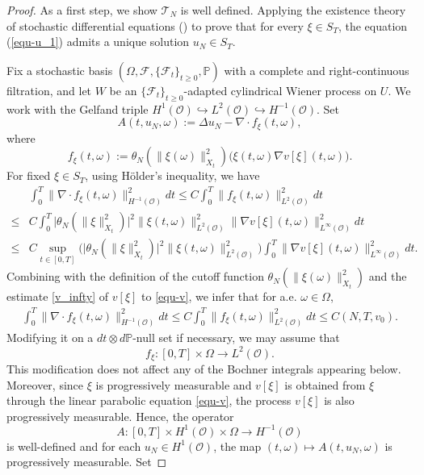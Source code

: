 \documentclass[reqno, 11pt]{amsart}
\theoremstyle{definition}
\numberwithin{equation}{section} \numberwithin{lem}{section}
\numberwithin{thm}{section} \numberwithin{prop}{section}
\numberwithin{cor}{section} \numberwithin{rem}{section}
\numberwithin{defn}{section}
\begin{document}
\begin{proof}
 As a first step, we show $\mathcal{T}_N$ is well defined. Applying the existence theory of stochastic differential equations (\cite[Theorem 4.2.4]{ liu2015stochastic}) to prove that for every $\xi\in S_T$, the equation (\ref{equ-u_1}) admits a unique solution $u_N\in S_T$.

  Fix a stochastic basis
$(\Omega,\mathcal F,\{\mathcal F_t\}_{t\ge0},\mathbb P)$
with a complete and right-continuous filtration, and let $W$ be an $\{\mathcal F_t\}_{t\ge0}$-adapted cylindrical Wiener
process on $U$. We work with the Gelfand triple $H^1(\mathcal {O})\hookrightarrow L^2(\mathcal {O})\hookrightarrow H^{-1}(\mathcal {O}).$
 Set \[
 A(t,u_N,\omega):=\Delta u_N-\nabla\cdot f_\xi(t,\omega),
 \]
 where
 $$
f_\xi(t,\omega):=\theta_N(\|\xi(\omega)\|_{X_t}^2)\Big(\xi(t,\omega)\nabla v[\xi](t,\omega)\Big).$$
 For  fixed $\xi\in S_T$, using H\"older's inequality, we have 
\begin{align}\label{f_xi}
\nonumber&\int_0^T \|\nabla\cdot f_\xi(t,\omega)\|_{H^{-1}(\mathcal {O})}^2dt\le C\int_0^T \| f_\xi(t,\omega)\|_{L^2(\mathcal {O})}^2dt \\
\nonumber\le&
C\int_0^T \big|\theta_N(\|\xi\|_{X_t}^2)\big|^2
\|\xi(t,\omega)\|_{L^2(\mathcal {O})}^2
\|\nabla v[\xi](t,\omega)\|_{L^\infty(\mathcal {O})}^2dt\\
\le&C\sup_{t\in[0,T]}\Big(\big|\theta_N(\|\xi\|_{X_t}^2)\big|^2\|\xi(t,\omega)\|_{L^2(\mathcal {O})}^2\Big)
\int_0^T \|\nabla v[\xi](t,\omega)\|_{L^\infty(\mathcal {O})}^2dt.
\end{align}
Combining with the definition of the cutoff function $\theta_N(\|\xi(\omega)\|_{X_t}^2)$ and   the estimate \eqref{v_infty} of $v[\xi]$ to \eqref{equ-v}, 
we infer that for a.e. $\omega\in\Omega$,
\begin{align}\label{f_xi_2}
    \int_0^T \|\nabla\cdot f_\xi(t,\omega)\|_{H^{-1}(\mathcal {O})}^2dt\le C\int_0^T \| f_\xi(t,\omega)\|_{L^2(\mathcal {O})}^2dt
\le
C(N,T,v_0).
\end{align}
Modifying it on a
	\(dt\otimes d\mathbb P\)-null set if necessary, we may assume that
	\[
	f_\xi:[0,T]\times\Omega\to L^2(\mathcal O).
	\]
	 This modification does not affect any of the
	Bochner integrals appearing below.
Moreover,  since $\xi$ is progressively measurable and $v[\xi]$ is obtained from $\xi$ through the linear parabolic equation \eqref{equ-v}, the process $v[\xi]$ is also progressively measurable. Hence, the operator $$A:[0,T]\times H^1(\mathcal {O})\times\Omega\to H^{-1}(\mathcal {O})$$ is well-defined and for each $u_N\in  H^1(\mathcal {O})$, the map $(t,\omega)\mapsto A(t,u_N,\omega) $ is progressively measurable. Set

\end{proof}
\end{document}
